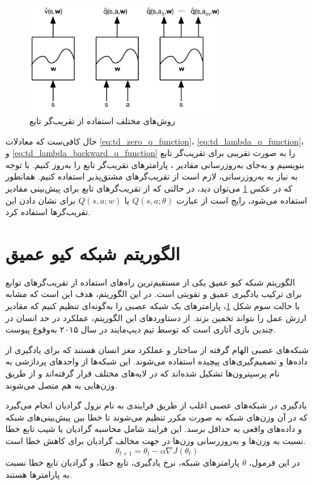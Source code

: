 \begin{figure}[H]
    \centering
    \includegraphics[width=0.75\textwidth]{images/function_approximators.png}
    \caption{روش‌های مختلف استفاده از تقریب‌گر تابع}\label{fig:func_approx}
\end{figure}
حال کافی‌ست که معادلات \ref{eq:td_zero_q_function}، \ref{eq:td_lambda_q_function}، و \ref{eq:td_lambda_backward_q_function} را به صورت تقریبی برای تقریب‌گر تابع بنویسیم
و به‌جای به‌روز‌رسانی مقادیر ، پارامتر‌های تقریب‌گر تابع را به‌روز کنیم.
با توجه به نیاز به به‌روز‌رسانی، لازم است از تقریب‌گر‌های مشتق‌پذیر استفاده کنیم.
همانطور که در عکس \ref{fig:func_approx}
می‌توان دید، در حالتی که از تقریب‌گر‌های تابع برای پیش‌بینی مقادیر  استفاده می‌شود،
رایج است از عبارت 
$Q(s, a; \theta)$
یا $Q(s, a; w)$
برای نشان دادن این تقریب‌گر‌ها استفاده کرد.

\section{الگوریتم شبکه کیو عمیق}
الگوریتم شبکه کیو عمیق
 یکی از مستقیم‌ترین راه‌های استفاده از تقریب‌گر‌های توابع برای ترکیب یادگیری عمیق و تقویتی است.
در این الگوریتم، هدف این است که مشابه با حالت سوم شکل \ref{fig:func_approx}،
پارامتر‌های یک شبکه عصبی را به‌گونه‌ای تنظیم کنیم که مقادیر ارزش عمل را بتواند تخمین بزند.
از دستاورد‌های این الگوریتم، عملکرد در حد انسان در چندین بازی آتاری است
که توسط تیم دیپ‌مایند
در سال ۲۰۱۵ به‌وقوع پیوست\cite{mnih2013playing}.

شبکه‌های عصبی الهام گرفته از ساختار و عملکرد مغز انسان هستند که برای یادگیری از داده‌ها و تصمیم‌گیری‌های پیچیده استفاده می‌شوند.
 این شبکه‌ها از واحدهای پردازشی به نام پرسپترون‌ها
  تشکیل شده‌اند که در لایه‌های مختلف قرار گرفته‌اند و از طریق وزن‌هایی به هم متصل می‌شوند.
 
 یادگیری در شبکه‌های عصبی اغلب از طریق فرایندی به نام نزول گرادیان
  انجام می‌گیرد که در آن وزن‌های شبکه به صورت مکرر تنظیم می‌شوند تا خطا بین پیش‌بینی‌های شبکه و داده‌های واقعی به حداقل برسد. این فرایند شامل محاسبه گرادیان یا شیب تابع خطا نسبت به وزن‌ها و به‌روزرسانی وزن‌ها در جهت مخالف گرادیان برای کاهش خطا است.
\begin{equation}\label{eq:gradient_descent}
    \theta_{t+1} = \theta_t - \alpha \nabla J(\theta_t)
\end{equation}
در این فرمول، $\theta$
پارامتر‌های شبکه،
\lr{$\alpha$}
نرخ یادگیری،
تابع خطا، و
گرادیان تابع خطا نسبت به پارامتر‌ها هستند.

